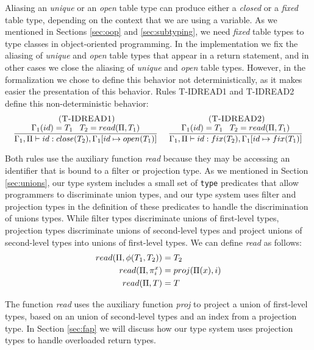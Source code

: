 Aliasing an \emph{unique} or an \emph{open} table type can produce
either a \emph{closed} or a \emph{fixed} table type, depending on
the context that we are using a variable.
As we mentioned in Sections \ref{sec:oop} and \ref{sec:subtyping},
we need \emph{fixed} table types to type classes in object-oriented programming.
In the implementation we fix the aliasing of \emph{unique} and \emph{open}
table types that appear in a return statement, and in other cases we
close the aliasing of \emph{unique} and \emph{open} table types.
However, in the formalization we chose to define this behavior not
deterministically, as it makes easier the presentation of this behavior.
Rules \textsc{T-IDREAD1} and \textsc{T-IDREAD2} define this non-deterministic behavior:
\[
\begin{array}{c}
\begin{array}{c}
\; (\textsc{T-IDREAD1})\\
\dfrac{\Gamma_{1}(id) = T_{1} \;\;\; T_{2} = read(\Pi, T_{1})}
      {\Gamma_{1}, \Pi \vdash id:close(T_{2}), \Gamma_{1}[id \mapsto open(T_{1})]}
\end{array}
\;
\begin{array}{c}
\; (\textsc{T-IDREAD2})\\
\dfrac{\Gamma_{1}(id) = T_{1} \;\;\; T_{2} = read(\Pi, T_{1})}
      {\Gamma_{1}, \Pi \vdash id:fix(T_{2}), \Gamma_{1}[id \mapsto fix(T_{1})]}
\end{array}
\end{array}
\]

Both rules use the auxiliary function \emph{read} because they may be
accessing an identifier that is bound to a filter or projection type.
As we mentioned in Section \ref{sec:unions}, our type system includes
a small set of \texttt{type} predicates that allow programmers to
discriminate union types, and our type system uses filter and projection
types in the definition of these predicates to handle the discrimination
of unions types.
While filter types discriminate unions of first-level types, projection
types discriminate unions of second-level types and project unions of
second-level types into unions of first-level types.
We can define \emph{read} as follows:
\begin{align*}
read(\Pi, \phi(T_{1},T_{2})) & = T_{2}\\
read(\Pi, \pi_{i}^{x}) & = proj(\Pi(x), i)\\
read(\Pi, T) & = T
\end{align*}

The function \emph{read} uses the auxiliary function \emph{proj}
to project a union of first-level types, based on an union of
second-level types and an index from a projection type.
In Section \ref{sec:fap} we will discuss how our type system uses
projection types to handle overloaded return types.

